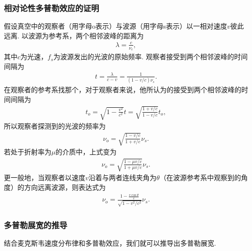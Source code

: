 \documentclass{assignment}
\begin{document}
\subsubsection{相对论性多普勒效应的证明}
假设真空中的观察者（用字母o表示）与波源（用字母s表示）以一相对速度$v$彼此远离. 以波源为参考系，两个相邻波峰的距离为
\begin{align}
    \lambda=\frac{c}{\nu_c},
\end{align}
其中$c$为光速，$f_s$为波源发出的光波的原始频率. 观察者接受到两个相邻波峰的时间间隔为
\begin{align}
    t=\frac{\lambda}{c-v}=\frac{1}{(1-v/c)\nu_s}.
\end{align}
在观察者的参考系找那个，对于观察者来说，他所认为的接受到两个相邻波峰的时间间隔为
\begin{align}
    t_o=\sqrt{1-\frac{v^2}{c^2}}t=\sqrt{\frac{1+v/c}{1-v/c}}t_o,
\end{align}
所以观察者探测到的光波的频率为
\begin{align}
    \nu_o=\sqrt{\frac{1-v/c}{1+v/c}}\nu_s.
\end{align}
若处于折射率为$\mu$的介质中，上式变为
\begin{align}
    \nu_o=\sqrt{\frac{1-\mu v/c}{1+\mu v/c}}\nu_s.
\end{align}
更一般地，当观察者以速度$v$沿着与两者连线夹角为$\theta$（在波源参考系中观察到的角度）的方向远离波源，则表达式为
\begin{align}
    \nu_o=\frac{1-\frac{v\cos\theta}{c}}{\sqrt{1-v^2/c^2}}\nu_s.
\end{align}

\subsubsection{多普勒展宽的推导}
结合麦克斯韦速度分布律和多普勒效应，我们就可以推导出多普勒展宽.\\
\end{document}
